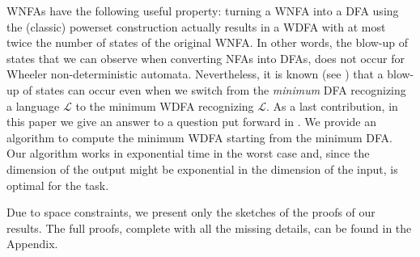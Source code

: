 \documentclass[runningheads]{llncs}
\begin{document}
WNFAs have the following useful property: turning a WNFA into a DFA using the (classic) powerset construction actually results in a WDFA with at most twice the number of states of the original WNFA. 
In other words, the  blow-up of states that we can observe  when converting NFAs into DFAs, does not occur for Wheeler non-deterministic automata.
Nevertheless, it is known (see \cite{ADPP}) that a blow-up of  states can occur even when we switch from the \emph{minimum} DFA recognizing a language $\mathcal L$ to the minimum WDFA recognizing $\mathcal L$. 
As a last contribution, in this paper we give an answer to a question put forward in \cite{ADPP}. We provide an algorithm to compute the minimum WDFA starting from the minimum DFA. Our algorithm  works in exponential time in the worst case and, since the dimension of the output might be exponential in the dimension of the input, is  optimal for the task. 

Due to space constraints, we present only the sketches of the proofs of our results. The full proofs, complete with all the missing details, can be found in the Appendix.
\end{document}
